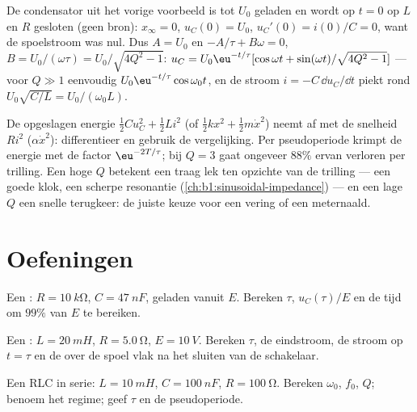 \begin{example}[Beginvoorwaarden]\label{ex:b1:transient-regimes:ic}
De condensator uit het vorige voorbeeld is tot $U_0$ geladen en wordt op
$t = 0$ op $L$ en $R$ gesloten (geen bron): $x_\infty = 0$,
$u_C(0) = U_0$, $u_C'(0) = i(0)/C = 0$, want de spoelstroom was nul.
Dus $A = U_0$ en $-A/\tau + B\omega = 0$, $B = U_0/(\omega\tau) =
U_0/\sqrt{4Q^2 - 1}$: $u_C = U_0\eu^{-t/\tau}[\cos\omega t + \sin(\omega
t)/\sqrt{4Q^2 - 1}]$ --- voor $Q \gg 1$ eenvoudig $U_0\eu^{-t/\tau}\cos\omega_0 t$,
en de stroom $i = -C\,\dd u_C/\dd t$ piekt rond $U_0\sqrt{C/L} =
U_0/(\omega_0 L)$.
\end{example}

\begin{remark}[Energie]\label{rem:b1:transient-regimes:energy}
De opgeslagen energie $\tfrac12 Cu_C^2 + \tfrac12 Li^2$ (of $\tfrac12 kx^2
+ \tfrac12 m\dot x^2$) neemt af met de snelheid $Ri^2$ ($\alpha\dot x^2$):
differentieer en gebruik de vergelijking. Per pseudoperiode krimpt de energie
met de factor $\eu^{-2T/\tau}$; bij $Q = 3$ gaat ongeveer $88\%$ ervan
verloren per trilling. Een hoge $Q$ betekent een traag lek ten opzichte van de
trilling --- een goede klok, een scherpe resonantie
(\cref{ch:b1:sinusoidal-impedance}) --- en een lage $Q$ een snelle terugkeer:
de juiste keuze voor een vering of een meternaald.
\end{remark}

\section{Oefeningen}

\begin{exercise}[$\star$]\label{exo:b1:transient-regimes:1}
Een : $R = \qty{10}{k\ohm}$, $C = \qty{47}{nF}$, geladen vanuit
$E$. Bereken $\tau$, $u_C(\tau)/E$ en de tijd om $99\%$ van $E$ te bereiken.
\end{exercise}

\begin{exercise}[$\star$]\label{exo:b1:transient-regimes:2}
Een : $L = \qty{20}{mH}$, $R = \qty{5.0}{\ohm}$, $E = \qty{10}{V}$.
Bereken $\tau$, de eindstroom, de stroom op $t = \tau$ en de
 over de spoel vlak na het sluiten van de schakelaar.
\end{exercise}

\begin{exercise}[$\star$]\label{exo:b1:transient-regimes:3}
Een RLC in serie: $L = \qty{10}{mH}$, $C = \qty{100}{nF}$, $R = \qty{100}{\ohm}$.
Bereken $\omega_0$, $f_0$, $Q$; benoem het regime; geef $\tau$ en de
pseudoperiode.
\end{exercise}

